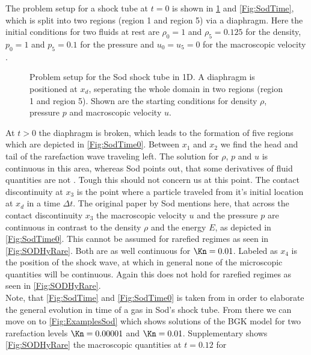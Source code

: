 The problem setup for a shock tube at \(t=0\) is shown in \cref{Fig:SodProbSetup} and \cref{Fig:SodTime}, which is split into two regions (region 1 and region 5) via a diaphragm. Here the initial conditions for two fluids at rest are \(\rho_0 = 1\) and \(\rho_5=0.125\) for the density, \(p_0=1\) and \(p_5=0.1\) for the pressure and \(u_0=u_5=0\) for the macroscopic velocity \cite{Sod}.
\begin{figure}[H]
	\centering
	
	\caption{Problem setup for the Sod shock tube in 1D. A diaphragm is positioned at \(x_d\), seperating the whole domain in two regions (region 1 and region 5). Shown are the starting conditions for density \(\rho\), pressure \(p\) and macroscopic velocity \(u\).}
	\label{Fig:SodProbSetup}
\end{figure}
At \(t>0\) the diaphragm is broken, which leads to the formation of five regions which are depicted in \cref{Fig:SodTime0}. Between \(x_1\) and \(x_2\) we find the head and tail of the rarefaction wave traveling left. The solution for \(\rho\), \(p\) and \(u\) is continuous in this area, whereas Sod points out, that some derivatives of fluid quantities are not \cite{Sod}. Tough this should not concern us at this point. The contact discontinuity at \(x_3\) is the point where a particle traveled from it's initial location at \(x_d\) in a time \(\Delta t\). The original paper by Sod mentions here, that across the contact discontinuity \(x_3\) the macroscopic velocity \(u\) and the pressure \(p\) are continuous in  contrast to the density \(\rho\) and the energy \(E\), as depicted in \cref{Fig:SodTime0}. This cannot be assumed for rarefied regimes as seen in \cref{Fig:SODHyRare}. Both are as well continuous for \(\Kn=0.01\). Labeled as \(x_4\) is the position of the shock wave, at which in general none of the microscopic quantities will be continuous. Again this does not hold for rarefied regimes as seen in \cref{Fig:SODHyRare}.\\
Note, that \cref{Fig:SodTime} and \cref{Fig:SodTime0} is taken from \cite{Sod} in order to elaborate the general evolution in time of a gas in Sod's shock tube. From there we can move on to \cref{Fig:ExamplesSod} which shows solutions of the BGK model for two rarefaction levels \(\Kn=0.00001\) and \(\Kn=0.01\). Supplementary shows \cref{Fig:SODHyRare} the macroscopic quantities at \(t=0.12\) for  
